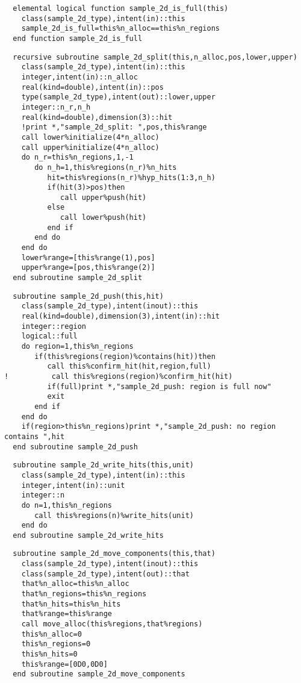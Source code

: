 \begin{Verbatim}
  elemental logical function sample_2d_is_full(this)
    class(sample_2d_type),intent(in)::this
    sample_2d_is_full=this%n_alloc==this%n_regions
  end function sample_2d_is_full
\end{Verbatim}

\begin{Verbatim}
  recursive subroutine sample_2d_split(this,n_alloc,pos,lower,upper)
    class(sample_2d_type),intent(in)::this
    integer,intent(in)::n_alloc
    real(kind=double),intent(in)::pos
    type(sample_2d_type),intent(out)::lower,upper
    integer::n_r,n_h
    real(kind=double),dimension(3)::hit
    !print *,"sample_2d_split: ",pos,this%range
    call lower%initialize(4*n_alloc)
    call upper%initialize(4*n_alloc)
    do n_r=this%n_regions,1,-1
       do n_h=1,this%regions(n_r)%n_hits
          hit=this%regions(n_r)%hyp_hits(1:3,n_h)
          if(hit(3)>pos)then
             call upper%push(hit)
          else
             call lower%push(hit)             
          end if
       end do
    end do
    lower%range=[this%range(1),pos]
    upper%range=[pos,this%range(2)]
  end subroutine sample_2d_split
\end{Verbatim}

\begin{Verbatim}
  subroutine sample_2d_push(this,hit)
    class(sample_2d_type),intent(inout)::this
    real(kind=double),dimension(3),intent(in)::hit
    integer::region
    logical::full
    do region=1,this%n_regions
       if(this%regions(region)%contains(hit))then
          call this%confirm_hit(hit,region,full)
!          call this%regions(region)%confirm_hit(hit)
          if(full)print *,"sample_2d_push: region is full now"
          exit
       end if
    end do
    if(region>this%n_regions)print *,"sample_2d_push: no region contains ",hit
  end subroutine sample_2d_push
\end{Verbatim}

\begin{Verbatim}
  subroutine sample_2d_write_hits(this,unit)
    class(sample_2d_type),intent(in)::this
    integer,intent(in)::unit
    integer::n
    do n=1,this%n_regions
       call this%regions(n)%write_hits(unit)
    end do
  end subroutine sample_2d_write_hits
\end{Verbatim}

\begin{Verbatim}
  subroutine sample_2d_move_components(this,that)
    class(sample_2d_type),intent(inout)::this
    class(sample_2d_type),intent(out)::that
    that%n_alloc=this%n_alloc
    that%n_regions=this%n_regions
    that%n_hits=this%n_hits
    that%range=this%range
    call move_alloc(this%regions,that%regions)
    this%n_alloc=0
    this%n_regions=0
    this%n_hits=0
    this%range=[0D0,0D0]
  end subroutine sample_2d_move_components
\end{Verbatim}

